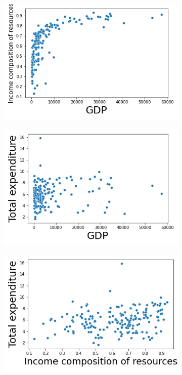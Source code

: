 \begin{itemize}
               \begin{figure}[H]
              \centering
              \begin{subfigure}{0.3\linewidth}
                \centering
                \includegraphics[width=\textwidth]{img/13.png}
              \end{subfigure}
              \hfill
                \begin{subfigure}{0.3\linewidth}
                \centering
                \includegraphics[width=\textwidth]{img/14.png}
              \end{subfigure}
                \hfill
                \begin{subfigure}{0.3\linewidth}
                \centering
                \includegraphics[width=\textwidth]{img/15.png}

\end{subfigure}
\end{figure}
\end{itemize}
